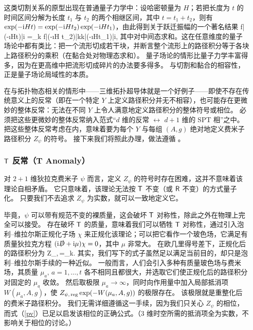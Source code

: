 这类切割关系的原型出现在普通量子力学中：设哈密顿量为 $H$；若把长度为 $t$ 的时间区间分解为长度 $t_1$ 与 $t_2$ 的两个相继区间，其中 $t=t_1+t_2$，则有 $\exp(-{\mathrm i} Ht)=\exp(-{\mathrm i} Ht_2)\exp(-{\mathrm i} Ht_1)$，由此得到关于跃迁振幅的一个著名结果
\be\label{cutting}\langle f|\exp(-\i Ht)|i\rangle
=\sum_k \langle f|\exp(-\i H t_2)|k\rangle \langle k|\exp(-\i Ht_1)|i\rangle,\ee
其中对中间态求和。这在任意维度的量子场论中都有类比：把一个流形切成若干块，并断言整个流形上的路径积分等于各块上路径积分的乘积（在黏合处对物理态求和）。
量子场论的情形比量子力学丰富得多，因为在更高维中把流形切成碎片的办法要多得多。
与切割和黏合的相容性，正是量子场论局域性的本质。

在与拓扑物态相关的情形中——三维拓扑超导体就是一个好例子——即使不存在传统意义上的反常（即在一个特定 $Y$ 上定义路径积分并无不相容），也可能存在更微妙的整体反常：无法在不同 $Y$ 上令人满意地定义路径积分的整体符号或相位。
必须把这些更微妙的整体反常纳入范式“$d$ 维的反常 $\longleftrightarrow$ $d+1$ 维的 SPT 相”之中。
把这些整体反常考虑在内，意味着要为每个 $Y$ 与每组 $(A,g)$ 绝对地定义费米子路径积分 $Z_\psi$ 的符号。
接下来我们将照此办理，做法遵循 \cite{ADM}。

\subsubsection{${\sf T}$ 反常（T Anomaly）}\label{zelfan}

对 $2+1$ 维狄拉克费米子 $\psi$ 而言，定义 $Z_\psi$ 的符号时存在困难，这并不意味着该理论自相矛盾。
它只意味着，该理论无法按 ${\sf T}$ 不变（或 ${\sf R}$ 不变）的方式量子化。
只要我们不去追求 $Z_\psi$ 为实数，就可以一致地定义它。

毕竟，$\psi$ 可以带有规范不变的裸质量，这会破坏 ${\sf T}$ 对称性，除此之外在物理上完全可以接受。
存在破坏 ${\sf T}$ 的质量，意味着我们可以牺牲 ${\sf T}$ 对称性，通过引入泡利--维拉尔斯正规化子场 $\chi$ 来正规化该理论；可以把它看作一个玻色场，它满足有质量狄拉克方程 $({\mathrm i}\slashed{D}+{\mathrm i}\mu)\chi=0$，其中 $\mu$ 非常大。
在欧几里得号差下，正规化后的路径积分为
\be\label{pv} Z_{\psi,\,\reg}=\prod_k. \ee
其实，我们写下的式子虽然足以满足当前目的，却只是泡利--维拉尔斯手续的一种近似。
一般而言，人们会引入多种有质量玻色场与费米场，其质量 $\mu_a, \,a=1,\dots, t$ 各不相同且都很大，并选取它们使正规化后的路径积分对固定的 $\mu_a$ 收敛。
然后取极限 $\mu_a\to\infty$，同时向作用量中加入局部抵消项 $W(\mu_a, A,g)$，使 $Z_{\psi,\,{\mathrm{reg}}}\exp(-W(\mu_a,A,g))$ 的极限存在。
该极限就是重整化后的费米子路径积分。
我们无需详细遵循这一手续，因为我们只关心 $Z_\psi$ 的相位，而式（\ref{pv}）已足以启发该相位的正确公式。（3 维时空所需的抵消项全为实数，不影响关于相位的讨论。）

